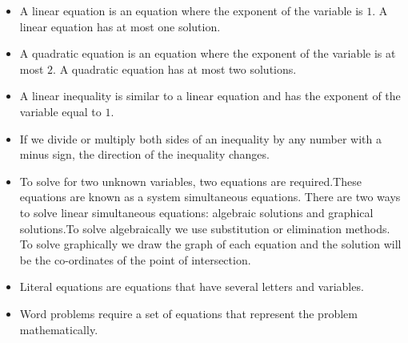 \begin{itemize}[noitemsep]
\item A linear equation is an equation where the exponent of the variable is $1$. A linear equation has at most one solution.
\item A quadratic equation is an equation where the exponent of the variable is at most $2$. A quadratic equation has at most two solutions.
\item A linear inequality is similar to a linear equation and has the exponent of the variable equal to $1$.
\item If we divide or multiply both sides of an inequality by any number with a minus sign, the direction of the inequality changes. 
\item To solve for two unknown variables, two equations are required.These equations are known as a system simultaneous equations. There are two ways to solve linear simultaneous equations: algebraic solutions and graphical solutions.To solve algebraically we use substitution or elimination methods. To solve graphically we draw the graph of each equation and the solution will be the co-ordinates of the point of intersection. 
\item Literal equations are equations that have several letters and variables.
\item Word problems require a set of equations that represent the problem mathematically. 
\end{itemize}

